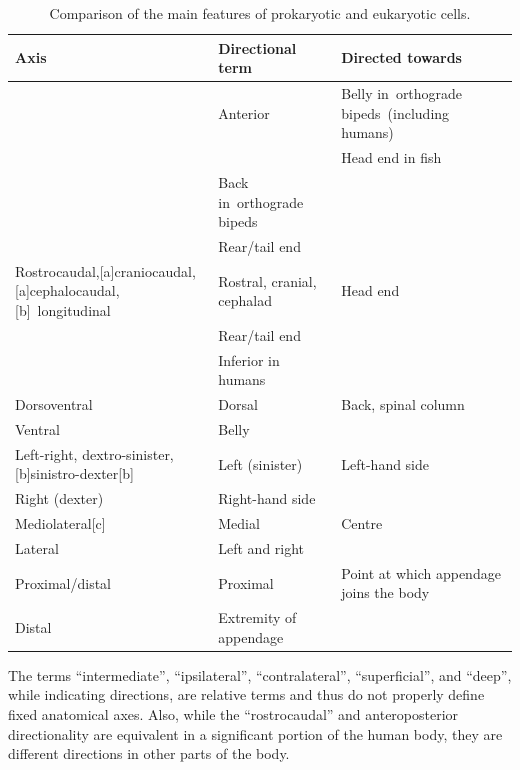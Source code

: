 \documentclass[]{book}
\begin{document}
\begin{longtable}[t]{>{\raggedright\arraybackslash}p{30em}>{\raggedright\arraybackslash}p{10em}>{\raggedright\arraybackslash}p{10em}}
\caption{\label{tab:axes}Comparison of the main features of prokaryotic and eukaryotic cells.}\\
\toprule
Axis & Directional term & Directed towards\\
\midrule
\rowcolor{gray!6}   & Anterior & Belly in orthograde bipeds (including humans)\\

\multirow{-2}{30em}{\raggedright\arraybackslash Anteroposterior} &  & Head end in fish\\
\cmidrule{1-3}
\rowcolor{gray!6}   & Back in orthograde bipeds & \\

\multirow{-2}{30em}{\raggedright\arraybackslash Posterior} & Rear/tail end & \\
\cmidrule{1-3}
\rowcolor{gray!6}  Rostrocaudal,[a]craniocaudal,[a]cephalocaudal,[b] longitudinal & Rostral, cranial, cephalad & Head end\\
\cmidrule{1-3}
 & Rear/tail end & \\

\rowcolor{gray!6}  \multirow{-2}{30em}{\raggedright\arraybackslash Caudal} & Inferior in humans & \\
\cmidrule{1-3}
Dorsoventral & Dorsal & Back, spinal column\\
\cmidrule{1-3}
\rowcolor{gray!6}  Ventral & Belly & \\
\cmidrule{1-3}
Left-right, dextro-sinister,[b]sinistro-dexter[b] & Left (sinister) & Left-hand side\\
\cmidrule{1-3}
\rowcolor{gray!6}  Right (dexter) & Right-hand side & \\
\cmidrule{1-3}
Mediolateral[c] & Medial & Centre\\
\cmidrule{1-3}
\rowcolor{gray!6}  Lateral & Left and right & \\
\cmidrule{1-3}
Proximal/distal & Proximal & Point at which appendage joins the body\\
\cmidrule{1-3}
\rowcolor{gray!6}  Distal & Extremity of appendage & \\
\bottomrule
\end{longtable}

The terms ``intermediate'', ``ipsilateral'', ``contralateral'', ``superficial'', and ``deep'', while indicating directions, are relative terms and thus do not properly define fixed anatomical axes. Also, while the ``rostrocaudal'' and anteroposterior directionality are equivalent in a significant portion of the human body, they are different directions in other parts of the body.
\end{document}
